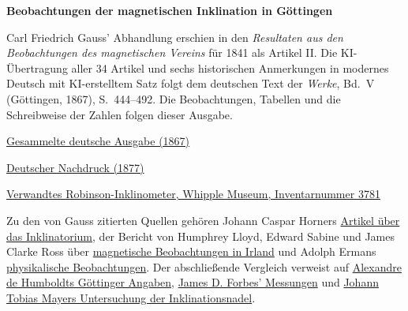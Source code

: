 \clearpage
\thispagestyle{empty}
\begin{center}\Large\textbf{Beobachtungen der magnetischen Inklination in Göttingen}\end{center}

Carl Friedrich Gauss’ Abhandlung erschien in den \textit{Resultaten aus den Beobachtungen des magnetischen Vereins} für 1841 als Artikel II. Die KI-Übertragung aller 34 Artikel und sechs historischen Anmerkungen in modernes Deutsch mit KI-erstelltem Satz folgt dem deutschen Text der \textit{Werke}, Bd.~V (Göttingen, 1867), S.~444--492. Die Beobachtungen, Tabellen und die Schreibweise der Zahlen folgen dieser Ausgabe.

\medskip\noindent
\href{https://gdz.sub.uni-goettingen.de/id/PPN236006339}{Gesammelte deutsche Ausgabe (1867)}\par
\noindent\href{https://doi.org/10.1007/978-3-642-49319-5_22}{Deutscher Nachdruck (1877)}\par
\noindent\href{https://collections.whipplemuseum.cam.ac.uk/objects/12342/}{Verwandtes Robinson-Inklinometer, Whipple Museum, Inventarnummer 3781}

\medskip\noindent
Zu den von Gauss zitierten Quellen gehören Johann Caspar Horners \href{https://api.digitale-sammlungen.de/iiif/image/v2/bsb10131088_00105/full/1500,/0/default.jpg}{Artikel über das Inklinatorium}, der Bericht von Humphrey Lloyd, Edward Sabine und James Clarke Ross über \href{https://archive.org/download/reportofbritisha05unse/page/n207.jpg}{magnetische Beobachtungen in Irland} und Adolph Ermans \href{https://resolver.sub.uni-goettingen.de/purl?PPN329604732}{physikalische Beobachtungen}. Der abschließende Vergleich verweist auf \href{https://books.google.com/books?id=O_kOAAAAQAAJ&pg=PA152}{Alexandre de Humboldts Göttinger Angaben}, \href{https://doi.org/10.1017/S008045680002980X}{James D. Forbes’ Messungen} und \href{https://gdz.sub.uni-goettingen.de/id/PPN35283028X_0003_2NS}{Johann Tobias Mayers Untersuchung der Inklinationsnadel}.
\clearpage
